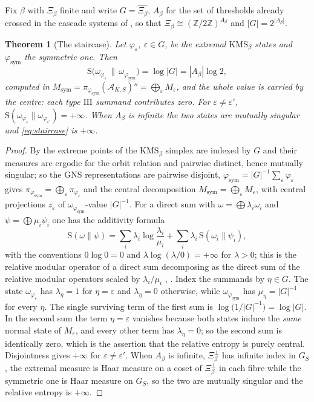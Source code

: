 \documentclass[11pt]{amsart}
\numberwithin{equation}{section}
\newtheorem{theorem}{Theorem}[section]
\theoremstyle{definition}
\theoremstyle{remark}
\newcommand{\Z}{\mathbb{Z}}
\newcommand{\cA}{\mathcal{A}}
\newcommand{\Ent}{\mathrm{S}}
\newcommand{\Msym}{M_{\mathrm{sym}}}
\newcommand{\phisym}{\varphi_{\mathrm{sym}}}
\begin{document}
Fix $\beta$ with $\Xi_\beta$ finite and write $G=\widehat{\Xi_\beta}$, $A_\beta$ for the set
of thresholds already crossed in the cascade systems of \cite[Prop.~4.16]{Main}, so that
$\Xi_\beta\cong(\Z/2\Z)^{A_\beta}$ and $|G|=2^{|A_\beta|}$.

\begin{theorem}[The staircase]\label{thm:staircase}
Let $\varphi_\varepsilon$, $\varepsilon\in G$, be the extremal $\mathrm{KMS}_\beta$ states
and $\phisym$ the symmetric one. Then
\begin{equation}\label{eq:staircase}
\Ent\bigl(\omega_{\varphi_\varepsilon}\,\big\|\,\omega_{\phisym}\bigr)=\log|G|=|A_\beta|\log2 ,
\end{equation}
computed in $\Msym=\pi_{\phisym}(\cA_{K,S})''=\bigoplus_{\varepsilon}M_\varepsilon$, and the
whole value is carried by the centre: each type $\mathrm{III}$ summand contributes zero. For
$\varepsilon\ne\varepsilon'$, $\Ent(\omega_{\varphi_\varepsilon}\|\omega_{\varphi_{\varepsilon'}})=+\infty$.
When $A_\beta$ is infinite the two states are mutually singular and \eqref{eq:staircase} is
$+\infty$.
\end{theorem}

\begin{proof}
By \cite[Thm.~3.6]{Main} the extreme points of the $\mathrm{KMS}_\beta$ simplex are indexed
by $G$ and their measures are ergodic for the orbit relation and pairwise distinct, hence
mutually singular; so the GNS representations are pairwise disjoint, $\phisym=|G|^{-1}\sum_\varepsilon\varphi_\varepsilon$
gives $\pi_{\phisym}=\bigoplus_\varepsilon\pi_{\varphi_\varepsilon}$ and the central
decomposition $\Msym=\bigoplus_\varepsilon M_\varepsilon$, with central projections
$z_\varepsilon$ of $\omega_{\phisym}$-value $|G|^{-1}$. For a direct sum with $\omega=\bigoplus\lambda_i\omega_i$ and
$\psi=\bigoplus\mu_i\psi_i$ one has the additivity formula
\[
\Ent(\omega\|\psi)=\sum_i\lambda_i\log\frac{\lambda_i}{\mu_i}+\sum_i\lambda_i\,\Ent(\omega_i\|\psi_i),
\]
with the conventions $0\log0=0$ and $\lambda\log(\lambda/0)=+\infty$ for $\lambda>0$; this is
the relative modular operator of a direct sum decomposing as the direct sum of the relative
modular operators scaled by $\lambda_i/\mu_i$ \cite{Araki}, \cite{OP}.
Index the summands by $\eta\in G$. The state $\omega_{\varphi_\varepsilon}$ has
$\lambda_\eta=1$ for $\eta=\varepsilon$ and $\lambda_\eta=0$ otherwise, while
$\omega_{\phisym}$ has $\mu_\eta=|G|^{-1}$ for every $\eta$. The single surviving term of
the first sum is $\log\bigl(1/|G|^{-1}\bigr)=\log|G|$. In the second sum the term
$\eta=\varepsilon$ vanishes because both states induce the \emph{same} normal state of
$M_\varepsilon$, and every other term has $\lambda_\eta=0$; so the second sum is identically
zero, which is the assertion that the relative entropy is purely central. Disjointness gives
$+\infty$ for $\varepsilon\ne\varepsilon'$. When $A_\beta$ is infinite, $\Xi_\beta^\perp$
has infinite index in $G_S$, the extremal measure is Haar measure on a coset of
$\Xi_\beta^\perp$ in each fibre while the symmetric one is Haar measure on $G_S$, so the two
are mutually singular and the relative entropy is $+\infty$.
\end{proof}
\end{document}
